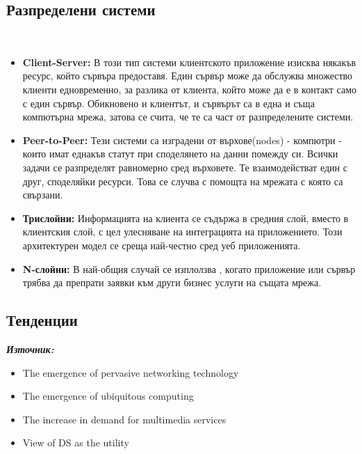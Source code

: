 \documentclass[11pt]{article} %
\newcommand{\italicBold}[1]{\textbf{\emph{#1}}}
\newcommand{\source}{\italicBold{Източник: }}
\begin{document}
\subsection{Разпределени системи}\\
\begin{itemize}[noitemsep]
	\item \textbf{Client-Server: } В този тип системи клиентското приложение изисква някакъв ресурс, който сървъра предоставя. Един сървър може да обслужва множество клиенти едновременно, за разлика от клиента, който може да е в контакт само с един сървър. Обикновено и клиентът, и сървърът са в една и съща компютърна мрежа, затова се счита, че те са част от разпределените системи. 
	\item \textbf{Peer-to-Peer: } Тези системи са изградени от върхове(nodes) - компютри - които имат еднакъв статут при споделянето на данни помежду си. Всички задачи се разпределят равномерно сред върховете. Те взаимодействат един с друг, споделяйки ресурси. Това се случва с помощта на мрежата с която са свързани.  
	\item \textbf{Трислойни: } Информацията на клиента се съдържа в средния слой, вместо в клиентския слой, с цел улесняване на интеграцията на приложението. Този архитектурен модел се среща най-честно сред уеб приложенията.
	\item \textbf{N-слойни: } В най-общия случай се изплолзва , когато приложение или сървър трябва да препрати заявки към други бизнес услуги на същата мрежа. \\\par
\end{itemize}

\subsection{Тенденции}
\source {}
\begin{itemize}[noitemsep]
	\item The emergence of pervasive networking technology
	\item The emergence of ubiquitous computing
	\item The increase in demand for multimedia services
	\item View of DS as the utility
\end{itemize}

  
\end{document}
